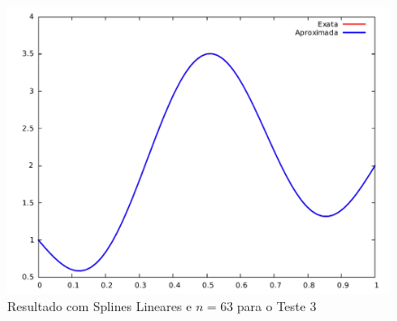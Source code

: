 \documentclass[12pt,a4paper]{report}
\begin{document}
\begin{figure}[H]
\centering
\includegraphics[width=0.7\linewidth]{t3splin63.pdf}
\caption{\label{splin}Resultado com Splines Lineares e $n=63$ para o Teste 3}
\end{figure}
\end{document}
